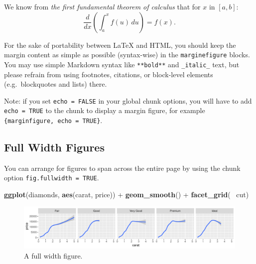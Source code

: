 \documentclass[]{tufte-handout}
\newenvironment{Shaded}{}{}
\newcommand{\KeywordTok}[1]{\textcolor[rgb]{0.00,0.44,0.13}{\textbf{#1}}}
\newcommand{\NormalTok}[1]{#1}
\newcommand{\OperatorTok}[1]{\textcolor[rgb]{0.40,0.40,0.40}{#1}}
\newcommand{\StringTok}[1]{\textcolor[rgb]{0.25,0.44,0.63}{#1}}
\begin{document}
\begin{marginfigure}
We know from \emph{the first fundamental theorem of calculus} that for
\(x\) in \([a, b]\):
\[\frac{d}{dx}\left( \int_{a}^{x} f(u)\,du\right)=f(x).\]
\end{marginfigure}

For the sake of portability between LaTeX and HTML, you should keep the
margin content as simple as possible (syntax-wise) in the
\texttt{marginefigure} blocks. You may use simple Markdown syntax like
\texttt{**bold**} and \texttt{\_italic\_} text, but please refrain from
using footnotes, citations, or block-level elements (e.g.~blockquotes
and lists) there.

Note: if you set \texttt{echo\ =\ FALSE} in your global chunk options,
you will have to add \texttt{echo\ =\ TRUE} to the chunk to display a
margin figure, for example
\texttt{\textasciigrave{}\textasciigrave{}\textasciigrave{}\{marginfigure,\ echo\ =\ TRUE\}}.

\hypertarget{full-width-figures}{%
\subsection{Full Width Figures}\label{full-width-figures}}

You can arrange for figures to span across the entire page by using the
chunk option \texttt{fig.fullwidth\ =\ TRUE}.

\begin{Shaded}
\begin{Highlighting}[]
\KeywordTok{ggplot}\NormalTok{(diamonds, }\KeywordTok{aes}\NormalTok{(carat, price)) }\OperatorTok{+}\StringTok{ }\KeywordTok{geom_smooth}\NormalTok{() }\OperatorTok{+}
\StringTok{  }\KeywordTok{facet_grid}\NormalTok{(}\OperatorTok{~}\StringTok{ }\NormalTok{cut)}
\end{Highlighting}
\end{Shaded}

\begin{figure}
\includegraphics{Epi_Notes_files/figure-latex/fig-fullwidth-1} \caption[A full width figure]{A full width figure.}\label{fig:fig-fullwidth}
\end{figure}
\end{document}
